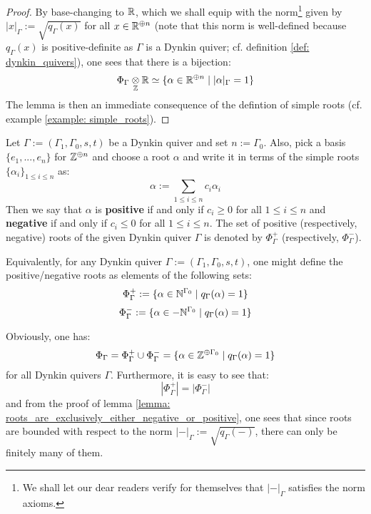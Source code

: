                 \begin{proof}
                    By base-changing to $\mathbb{R}$, which we shall equip with the norm\footnote{We shall let our dear readers verify for themselves that $|-|_{\Gamma}$ satisfies the norm axioms.} given by $|x|_{\Gamma} := \sqrt{q_{\Gamma}(x)}$ for all $x \in \mathbb{R}^{\oplus n}$ (note that this norm is well-defined because $q_{\Gamma}(x)$ is positive-definite as $\Gamma$ is a Dynkin quiver; cf. definition \ref{def: dynkin_quivers}), one sees that there is a bijection:
                        $$\Phi_{\Gamma} \tensor_{\Z} \R \cong \{\alpha \in \R^{\oplus n} \mid |\alpha|_{\Gamma} = 1\}$$
                    The lemma is then an immediate consequence of the defintion of simple roots (cf. example \ref{example: simple_roots}).
                \end{proof}
            \begin{definition} \label{def: negative_and_positive_roots}
                Let $\Gamma := (\Gamma_1, \Gamma_0, s, t)$ be a Dynkin quiver and set $n := \Gamma_0$. Also, pick a basis $\{e_1, ..., e_n\}$ for $\mathbb{Z}^{\oplus n}$ and choose a root $\alpha$ and write it in terms of the simple roots $\{\alpha_i\}_{1 \leq i \leq n}$ as:
                    $$\alpha := \sum_{1 \leq i \leq n} c_i \alpha_i$$
                Then we say that $\alpha$ is \textbf{positive} if and only if $c_i \geq 0$ for all $1 \leq i \leq n$ and \textbf{negative} if and only if $c_i \leq 0$ for all $1 \leq i \leq n$. The set of positive (respectively, negative) roots of the given Dynkin quiver $\Gamma$ is denoted by $\Phi_{\Gamma}^+$ (respectively, $\Phi_{\Gamma}^-$).
            \end{definition}
            \begin{remark}
                Equivalently, for any Dynkin quiver $\Gamma := (\Gamma_1, \Gamma_0, s, t)$, one might define the positive/negative roots as elements of the following sets:
                    $$\Phi_{\Gamma}^+ := \{\alpha \in \mathbb{N}^{\Gamma_0} \mid q_{\Gamma}(\alpha) = 1\}$$
                    $$\Phi_{\Gamma}^- := \{\alpha \in -\mathbb{N}^{\Gamma_0} \mid q_{\Gamma}(\alpha) = 1\}$$
            \end{remark}
            \begin{remark} \label{remark: number_of_positive_roots_of_dynkin_quivers}
                Obviously, one has:
                    $$\Phi_{\Gamma} = \Phi_{\Gamma}^+ \cup \Phi_{\Gamma}^- = \{\alpha \in \mathbb{Z}^{\oplus \Gamma_0} \mid q_{\Gamma}(\alpha) = 1\}$$
                for all Dynkin quivers $\Gamma$. Furthermore, it is easy to see that:
                    $$|\Phi_{\Gamma}^+| = |\Phi_{\Gamma}^-|$$
                and from the proof of lemma \ref{lemma: roots_are_exclusively_either_negative_or_positive}, one sees that since roots are bounded with respect to the norm $|-|_{\Gamma} := \sqrt{q_{\Gamma}(-)}$, there can only be finitely many of them.
            \end{remark}
            
